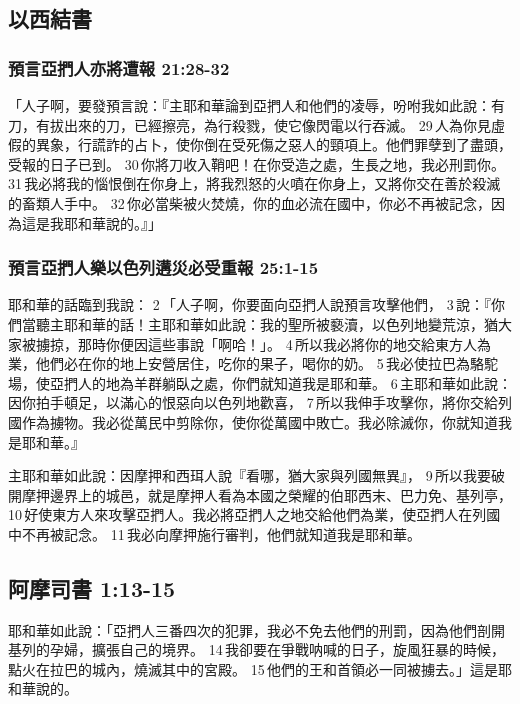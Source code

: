 \subsection{以西結書}
\subsubsection{預言亞捫人亦將遭報 21:28-32}
「人子啊，要發預言說：『主耶和華論到亞捫人和他們的凌辱，吩咐我如此說：有刀，有拔出來的刀，已經擦亮，為行殺戮，使它像閃電以行吞滅。 29 人為你見虛假的異象，行謊詐的占卜，使你倒在受死傷之惡人的頸項上。他們罪孽到了盡頭，受報的日子已到。 30 你將刀收入鞘吧！在你受造之處，生長之地，我必刑罰你。 31 我必將我的惱恨倒在你身上，將我烈怒的火噴在你身上，又將你交在善於殺滅的畜類人手中。 32 你必當柴被火焚燒，你的血必流在國中，你必不再被記念，因為這是我耶和華說的。』」

\subsubsection{預言亞捫人樂以色列遘災必受重報 25:1-15}
耶和華的話臨到我說： 2 「人子啊，你要面向亞捫人說預言攻擊他們， 3 說：『你們當聽主耶和華的話！主耶和華如此說：我的聖所被褻瀆，以色列地變荒涼，猶大家被擄掠，那時你便因這些事說「啊哈！」。 4 所以我必將你的地交給東方人為業，他們必在你的地上安營居住，吃你的果子，喝你的奶。 5 我必使拉巴為駱駝場，使亞捫人的地為羊群躺臥之處，你們就知道我是耶和華。 6 主耶和華如此說：因你拍手頓足，以滿心的恨惡向以色列地歡喜， 7 所以我伸手攻擊你，將你交給列國作為擄物。我必從萬民中剪除你，使你從萬國中敗亡。我必除滅你，你就知道我是耶和華。』

主耶和華如此說：因摩押和西珥人說『看哪，猶大家與列國無異』， 9 所以我要破開摩押邊界上的城邑，就是摩押人看為本國之榮耀的伯耶西末、巴力免、基列亭， 10 好使東方人來攻擊亞捫人。我必將亞捫人之地交給他們為業，使亞捫人在列國中不再被記念。 11 我必向摩押施行審判，他們就知道我是耶和華。

\subsection{阿摩司書 1:13-15}
耶和華如此說：「亞捫人三番四次的犯罪，我必不免去他們的刑罰，因為他們剖開基列的孕婦，擴張自己的境界。 14 我卻要在爭戰呐喊的日子，旋風狂暴的時候，點火在拉巴的城內，燒滅其中的宮殿。 15 他們的王和首領必一同被擄去。」這是耶和華說的。

